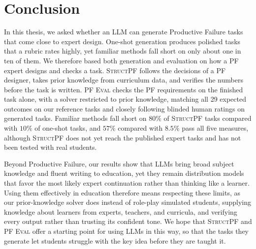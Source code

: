 \section{Conclusion}
\label{sec:disc-conclusion}

In this thesis, we asked whether an LLM can generate Productive Failure tasks that come close to expert design. One-shot generation produces polished tasks that a rubric rates highly, yet familiar methods fall short on only about one in ten of them. We therefore based both generation and evaluation on how a PF expert designs and checks a task. \textsc{StructPF} follows the decisions of a PF designer, takes prior knowledge from curriculum data, and verifies the numbers before the task is written. \textsc{PF Eval} checks the PF requirements on the finished task alone, with a solver restricted to prior knowledge, matching all 29 expected outcomes on our reference tasks and closely following blinded human ratings on generated tasks. Familiar methods fall short on $80\%$ of \textsc{StructPF} tasks compared with $10\%$ of one-shot tasks, and $57\%$ compared with $8.5\%$ pass all five measures, although \textsc{StructPF} does not yet reach the published expert tasks and has not been tested with real students.

Beyond Productive Failure, our results show that LLMs bring broad subject knowledge and fluent writing to education, yet they remain distribution models that favor the most likely expert continuation rather than thinking like a learner. Using them effectively in education therefore means respecting these limits, as our prior-knowledge solver does instead of role-play simulated students, supplying knowledge about learners from experts, teachers, and curricula, and verifying every output rather than trusting its confident tone. We hope that \textsc{StructPF} and \textsc{PF Eval} offer a starting point for using LLMs in this way, so that the tasks they generate let students struggle with the key idea before they are taught it.
